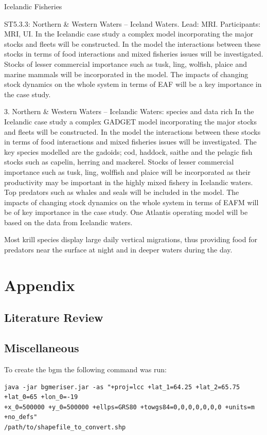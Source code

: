 \documentclass{report}
\begin{document}
Icelandic Fisheries

ST5.3.3: Northern \& Western Waters – Iceland Waters. Lead: MRI. Participants: MRI, UI.
In the Icelandic case study a complex model incorporating the major stocks and fleets will be constructed. In the model the interactions between these stocks in terms of food interactions and mixed fisheries issues will be investigated. Stocks of lesser commercial importance such as tusk, ling, wolfish, plaice and marine mammals will be incorporated in the model. The impacts of changing stock dynamics on the whole system in terms of EAF will be a key importance in the case study.

3. Northern \& Western Waters – Icelandic Waters: species and data rich
In the Icelandic case study a complex GADGET model incorporating the major stocks and fleets will be constructed. In the model the interactions between these stocks in terms of food interactions and mixed fisheries issues will be investigated. The key species modelled are the gadoids; cod, haddock, saithe and the pelagic fish stocks such as capelin, herring and mackerel. Stocks of lesser commercial importance such as tusk, ling, wolffish and plaice will be incorporated as their productivity may be important in the highly mixed fishery in Icelandic
waters. Top predators such as whales and seals will be included in the model. The impacts of changing stock dynamics on the whole system in terms of EAFM will be of key importance in the case study. One Atlantis operating model will be based on the data from Icelandic waters.


Most krill species display large daily vertical migrations, thus providing food for predators near the surface at night and in deeper waters during the day.

\printbibliography[heading=bibintoc]

\chapter{Appendix}

\section{Literature Review}

\section{Miscellaneous}

To create the bgm the following command was run:

\begin{verbatim}
java -jar bgmeriser.jar -as "+proj=lcc +lat_1=64.25 +lat_2=65.75 +lat_0=65 +lon_0=-19 
+x_0=500000 +y_0=500000 +ellps=GRS80 +towgs84=0,0,0,0,0,0,0 +units=m +no_defs"
/path/to/shapefile_to_convert.shp
\end{verbatim}
\end{document}
